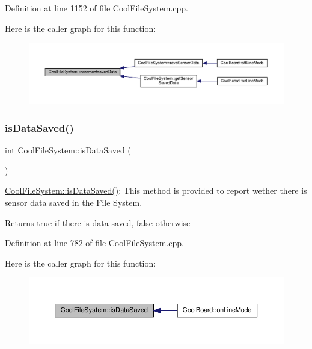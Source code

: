Definition at line 1152 of file Cool\+File\+System.\+cpp.

Here is the caller graph for this function\+:\nopagebreak
\begin{figure}[H]
\begin{center}
\leavevmode
\includegraphics[width=350pt]{class_cool_file_system_aae045125288f255f3e258073dcada2a6_icgraph}
\end{center}
\end{figure}
\mbox{\label{class_cool_file_system_ac86a40e7c3a1842f7342f698d34324f9}} 
\subsubsection{\texorpdfstring{is\+Data\+Saved()}{isDataSaved()}}
{\footnotesize\ttfamily int Cool\+File\+System\+::is\+Data\+Saved (\begin{DoxyParamCaption}{ }\end{DoxyParamCaption})}

\hyperlink{class_cool_file_system_ac86a40e7c3a1842f7342f698d34324f9}{Cool\+File\+System\+::is\+Data\+Saved()}\+: This method is provided to report wether there is sensor data saved in the File System.

\begin{DoxyReturn}{Returns}
true if there is data saved, false otherwise 
\end{DoxyReturn}


Definition at line 782 of file Cool\+File\+System.\+cpp.

Here is the caller graph for this function\+:\nopagebreak
\begin{figure}[H]
\begin{center}
\leavevmode
\includegraphics[width=350pt]{class_cool_file_system_ac86a40e7c3a1842f7342f698d34324f9_icgraph}
\end{center}
\end{figure}
\mbox{\label{class_cool_file_system_afa3a4feae94871d4d3b6bebb701c2e67}} 
